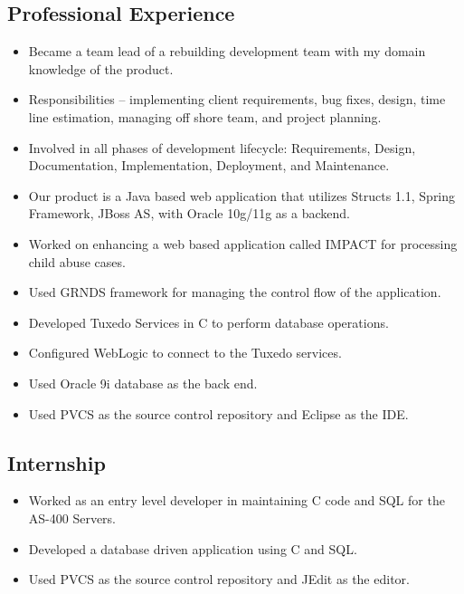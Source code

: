 \documentclass[11pt,letterpaper,sans]{moderncv} %
\begin{document}
  \subsection{Professional Experience}
     {\begin{itemize}
         \item Became a team lead of a rebuilding development team with my domain knowledge of the product.
         \item Responsibilities -- implementing client requirements, bug fixes, design, time line estimation, managing off shore team, and project planning.
         \item Involved in all phases of development lifecycle: Requirements, Design, Documentation, Implementation, Deployment, and Maintenance.
         \item Our product is a Java based web application that utilizes Structs 1.1, Spring Framework, JBoss AS, with Oracle 10g/11g as a backend.
     \end{itemize}}
     
     {\begin{itemize}
         \item Worked on enhancing a web based application called IMPACT for processing child abuse cases.
         \item Used GRNDS framework for managing the control flow of the application.
         \item Developed Tuxedo Services in C to perform database operations.
         \item Configured WebLogic to connect to the Tuxedo services.
         \item Used Oracle 9i database as the back end.
         \item Used PVCS as the source control repository and Eclipse as the IDE.
     \end{itemize}}

  \subsection{Internship}
     {\begin{itemize}
         \item Worked as an entry level developer in maintaining C code and SQL for the AS-400 Servers.
         \item Developed a database driven application using C and SQL.
         \item Used PVCS as the source control repository and JEdit as the editor.
     \end{itemize}}
  
\end{document}
